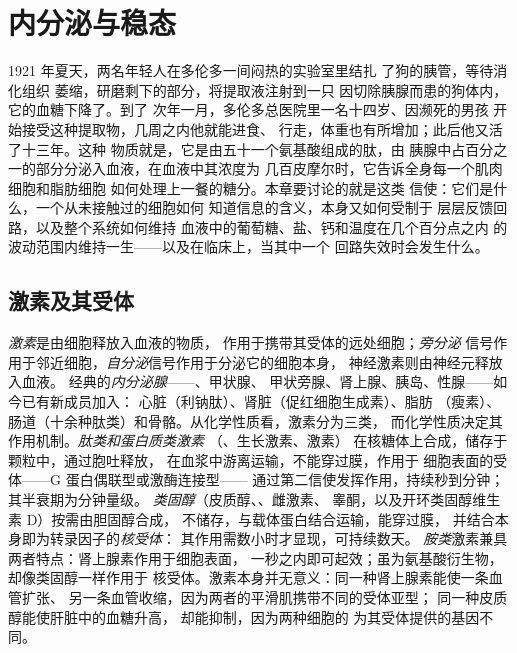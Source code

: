 \chapter{内分泌与稳态}\label{ch:b3:endocrinology}

1921 年夏天，两名年轻人在多伦多一间闷热的实验室里结扎
了狗的胰管，等待消化组织
萎缩，研磨剩下的部分，将提取液注射到一只
因切除胰腺而患的狗体内，它的血糖下降了。到了
次年一月，多伦多总医院里一名十四岁、因濒死的男孩
开始接受这种提取物，几周之内他就能进食、
行走，体重也有所增加；此后他又活了十三年。这种
物质就是，它是由五十一个氨基酸组成的肽，由
胰腺中占百分之一的部分分泌入血液，在血液中其浓度为
几百皮摩尔时，它告诉全身每一个肌肉细胞和脂肪细胞
如何处理上一餐的糖分。本章要讨论的就是这类
信使：它们是什么，一个从未接触过的细胞如何
知道信息的含义，本身又如何受制于
层层反馈回路，以及整个系统如何维持
血液中的葡萄糖、盐、钙和温度在几个百分点之内
的波动范围内维持一生——以及在临床上，当其中一个
回路失效时会发生什么。

\section{激素及其受体}

\begin{definition}[激素]\label{def:b3:endocrinology:hormone}
\emph{激素}是由细胞释放入血液的物质，
作用于携带其受体的远处细胞；\emph{旁分泌}
信号作用于邻近细胞，\emph{自分泌}信号作用于分泌它的细胞本身，
神经激素则由神经元释放入血液。
经典的\emph{内分泌腺}——、甲状腺、
甲状旁腺、肾上腺、胰岛、性腺——如今已有新成员加入：
心脏（利钠肽）、肾脏（促红细胞生成素）、脂肪
（瘦素）、肠道（十余种肽类）和骨骼。从化学性质看，激素分为三类，
而化学性质决定其作用机制。\emph{肽类和蛋白质类激素}
（、生长激素、激素）
在核糖体上合成，储存于颗粒中，通过胞吐释放，
在血浆中游离运输，不能穿过膜，作用于
细胞表面的受体——G 蛋白偶联型或激酶连接型——
通过第二信使发挥作用，持续秒到分钟；其半衰期为分钟量级。
\emph{类固醇}（皮质醇、、雌激素、
睾酮，以及开环类固醇维生素 D）按需由胆固醇合成，
不储存，与载体蛋白结合运输，能穿过膜，
并结合本身即为转录因子的\emph{核受体}：
其作用需数小时才显现，可持续数天。
\emph{胺类}激素兼具两者特点：肾上腺素作用于细胞表面，
一秒之内即可起效；虽为氨基酸衍生物，却像类固醇一样作用于
核受体。激素本身并无意义：同一种肾上腺素能使一条血管扩张、
另一条血管收缩，因为两者的平滑肌携带不同的受体亚型；
同一种皮质醇能使肝脏中的血糖升高，
却能抑制，因为两种细胞的
为其受体提供的基因不同。
\end{definition}

